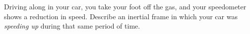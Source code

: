 Driving along in your car, you take your foot off the gas, and your speedometer
shows a reduction in speed. Describe an inertial frame in which your car
was \emph{speeding up} during that same period of time.
